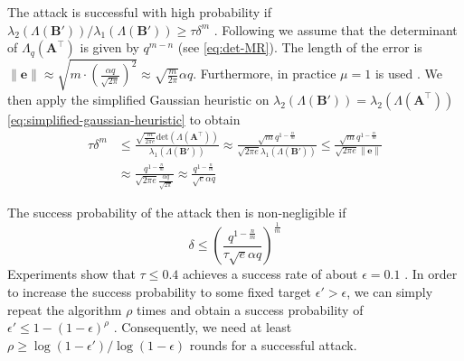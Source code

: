 The attack is successful with high probability if $\lambda_2(\Lambda(\mathbf{B}'))/\lambda_1(\Lambda(\mathbf{B}')) \geq \tau \delta^m$ \cite{AFG13}. Following \cite{Gop16} we assume that the determinant of $\Lambda_q(\mathbf{A}^\intercal)$ is given by $q^{m-n}$ (see \cref{eq:det-MR}). The length of the error is $\|\mathbf{e}\| \approx \sqrt{m\cdot \left(\frac{\alpha q}{\sqrt{2\pi}}\right)^2} \approx \sqrt{\frac{m}{2\pi}} \alpha q$. Furthermore, in practice $\mu=1$ is used \cite{APS15}. We then apply the simplified Gaussian heuristic on $\lambda_2(\Lambda(\mathbf{B}'))=\lambda_2(\Lambda(\mathbf{A}^\intercal))$ \cref{eq:simplified-gaussian-heuristic} to obtain
\begin{align}
  \tau \delta^m & \leq \frac{ \sqrt{\frac{m}{2\pi e}} \text{det}(\Lambda(\mathbf{A}^\intercal))}{\lambda_1(\Lambda(\mathbf{B}'))} \approx \frac{\sqrt{m} q^{1-\frac{n}{m}}}{\sqrt{2\pi e} \lambda_1(\Lambda(\mathbf{B}'))} \leq \frac{\sqrt{m} q^{1-\frac{n}{m}}}{\sqrt{2\pi e} \|\mathbf{e}\|} \\
                & \approx \frac{q^{1-\frac{n}{m}}}{\sqrt{2\pi e}  \frac{\alpha q}{\sqrt{2\pi}}} \approx \frac{q^{1-\frac{n}{m}}}{\sqrt{e} \alpha q}
\end{align}

The success probability of the attack then is non-negligible if
\begin{equation}
  \delta \leq \left(\frac{q^{1-\frac{n}{m}}}{\tau \sqrt{e} \alpha q}\right)^{\frac{1}{m}}
\end{equation}
Experiments show that $\tau \leq 0.4$ achieves a success rate of about $\epsilon = 0.1$ \cite{AFG13}. In order to increase the success probability to some fixed target $\epsilon' > \epsilon$, we can simply repeat the algorithm $\rho$ times and obtain a success probability of $\epsilon' \leq 1 - (1 - \epsilon)^\rho$ \cite{BBGS19}. Consequently, we need at least $\rho \geq \log(1-\epsilon')/\log(1-\epsilon)$ rounds for a successful attack.



